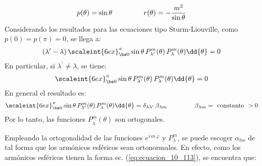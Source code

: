 \begin{align*}
p(\theta) = \sin \theta \, \hspace{1.5cm} r(\theta) = - \dfrac{m^{2}}{\sin \theta}
\end{align*}
Considerando los resultados para las ecuaciones tipo Sturm-Liouville, como $p(0) = p(\pi) = 0$, se llega a:
\begin{align*}
(\lambda^{\prime} - \lambda) \, \scaleint{6ex}_{\bs 0}^{\pi} \sin \theta \, P_{\lambda^{\prime}}^{m} (\theta) \, P_{\lambda}^{m} (\theta) \dd{\theta} = 0
\end{align*}
En particular, si $\lambda^{\prime} \neq \lambda$, se tiene:
\begin{align}
\scaleint{6ex}_{\bs 0}^{\pi} \sin \theta \, P_{\lambda^{\prime}}^{m} (\theta) \, P_{\lambda}^{m} (\theta) \dd{\theta} = 0
\label{eq:ecuacion_10_123}
\end{align}
En general el resultado es:
\begin{align}
\scaleint{6ex}_{\bs 0}^{\pi} \sin \theta \, P_{\lambda^{\prime}}^{m} (\theta) \, P_{\lambda}^{m} (\theta) \dd{\theta} = \delta_{\lambda \lambda^{\prime}} \, \beta_{\lambda m} \hspace{1.5cm} \beta_{\lambda m} = \mbox{ constante } > 0
\label{eq:ecuacion_10_124}
\end{align}
Por lo tanto, las funciones $P_{\lambda^{\prime}}^{m} (\theta)$ son ortogonales.
\par
Empleando la ortogonalidad de las funciones $e^{i \, m \, \varphi}$ y $P_{\lambda}^{m}$, se puede escoger $\alpha_{l m}$ de tal forma que los armónicos esféricos sean ortonormales. En efecto, como los armónicos esféricos tienen la forma ec. (\ref{eq:ecuacion_10_113}), se encuentra que:
